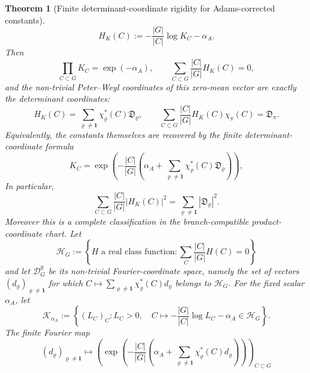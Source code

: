 \documentclass[11pt,a4paper]{amsart}
\theoremstyle{plain}
\newtheorem{theorem}{Theorem}[section]
\theoremstyle{definition}
\theoremstyle{remark}
\begin{document}
\begin{theorem}[Finite determinant-coordinate rigidity for Adams-corrected constants]
\begin{equation}
    H_K(C):=-\frac{|G|}{|C|}\log K_C-\alpha_A .
  \end{equation}
  Then
  \begin{equation}\label{eq:class-product-normalisation-constraint}
    \prod_{C\subset G}K_C=\exp(-\alpha_A),
    \qquad
    \sum_{C\subset G}\frac{|C|}{|G|}H_K(C)=0,
  \end{equation}
  and the non-trivial Peter--Weyl coordinates of this zero-mean vector are
  exactly the determinant coordinates:
  \begin{equation}\label{eq:class-product-fourier-coordinates}
    H_K(C)=
    \sum_{\varrho\ne\mathbf1}
      \chi_\varrho^\ast(C)\mathfrak D_\varrho,
    \qquad
    \sum_{C\subset G}\frac{|C|}{|G|}H_K(C)\chi_\pi(C)
    =\mathfrak D_\pi.
  \end{equation}
  Equivalently, the constants themselves are recovered by the finite
  determinant-coordinate formula
  \begin{equation}\label{eq:class-product-rigidity-product-formula}
    K_C=
    \exp\!\left(
      -\frac{|C|}{|G|}
      \left(
        \alpha_A+
        \sum_{\varrho\ne\mathbf1}
          \chi_\varrho^\ast(C)\mathfrak D_\varrho
      \right)
    \right),
  \end{equation}
  In particular,
  \begin{equation}\label{eq:class-product-parseval}
    \sum_{C\subset G}\frac{|C|}{|G|}|H_K(C)|^2
    =
    \sum_{\varrho\ne\mathbf1}|\mathfrak D_\varrho|^2.
  \end{equation}
  Moreover this is a complete classification in the branch-compatible
  product-coordinate chart.  Let
  \[
    \mathcal H_G:=
    \left\{H\text{ a real class function}:
      \sum_C\frac{|C|}{|G|}H(C)=0\right\}
  \]
  and let \(\mathcal D_G^{\mathbb R}\) be its non-trivial Fourier-coordinate
  space, namely the set of vectors \((d_\varrho)_{\varrho\ne\mathbf1}\) for
  which
  \(C\mapsto\sum_{\varrho\ne\mathbf1}\chi_\varrho^\ast(C)d_\varrho\) belongs
  to \(\mathcal H_G\).  For the fixed scalar \(\alpha_A\), let
  \[
    \mathscr K_{\alpha_A}:=
    \left\{(L_C)_C:
      L_C>0,\quad
      C\longmapsto -\frac{|G|}{|C|}\log L_C-\alpha_A\in\mathcal H_G
    \right\}.
  \]
  The finite Fourier map
  \begin{equation}\label{eq:class-product-rigidity-chart-map}
    (d_\varrho)_{\varrho\ne\mathbf1}
    \longmapsto
    \left(
      \exp\!\left(
        -\frac{|C|}{|G|}
        \left(
          \alpha_A+
          \sum_{\varrho\ne\mathbf1}\chi_\varrho^\ast(C)d_\varrho
        \right)
      \right)
    \right)_{C\subset G}

\end{equation}
\end{theorem}
\end{document}
